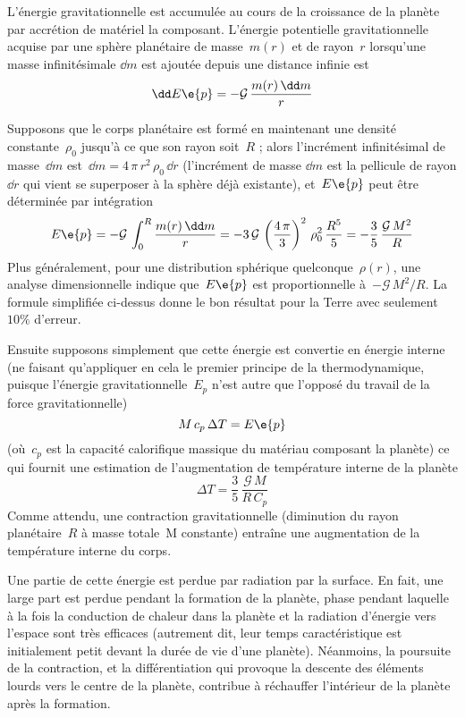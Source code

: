\sk
L'énergie gravitationnelle est accumulée au cours de la croissance de la planète
par accrétion de matériel la composant.
L'énergie potentielle gravitationnelle acquise par une sphère planétaire
de masse~$m(r)$ et de rayon~$r$ lorsqu'une masse infinitésimale $\dd m$
est ajoutée depuis une distance infinie est
\[ \dd E\e{p} = - \mathcal{G} \, \frac{m(r) \, \dd m}{r}  \]

\sk
Supposons que le corps planétaire est formé en maintenant une densité constante~$\rho_0$
jusqu'à ce que son rayon soit~$R$ ; alors l'incrément infinitésimal de masse~$\dd m$
est~$\dd m = 4 \, \pi \, r^2 \, \rho_0 \, \dd r$ 
(l'incrément de masse $\dd m$ est la pellicule de rayon $\dd r$ 
qui vient se superposer à la sphère déjà existante), 
et~$E\e{p}$ peut être déterminée par intégration
\[ E\e{p} = - \mathcal{G} \, \int_{0}^{R} \frac{m(r) \, \dd m}{r}  
= - 3 \, \mathcal{G} \, \left( \frac{4\,\pi}{3} \right)^2 \, \rho_0^2 \, \frac{R^5}{5}
= - \frac{3}{5} \, \frac{\mathcal{G}\,M^2}{R} \] 
\noindent Plus généralement, pour une distribution sphérique quelconque~$\rho(r)$,
une analyse dimensionnelle indique que~$E\e{p}$ est proportionnelle à~$-\mathcal{G}\,M^2/R$.
La formule simplifiée ci-dessus donne le bon résultat pour la Terre avec seulement~$10\%$ d'erreur.


\sk
Ensuite supposons simplement que cette énergie est convertie en énergie interne
(ne faisant qu'appliquer en cela le premier principe de la thermodynamique, puisque
l'énergie gravitationnelle~$E_p$ n'est autre que l'opposé du travail de la force gravitationnelle)
\[ M \, c_p \, \Delta T = E\e{p} \]
\noindent (où~$c_p$ est la capacité calorifique massique du matériau composant la planète)
ce qui fournit une estimation de l'augmentation de température interne de la planète
\[ \Delta T = \frac{3}{5} \, \frac{\mathcal{G}\,M}{R\,C_p} \]
\noindent Comme attendu, une contraction gravitationnelle 
(diminution du rayon planétaire~$R$ à masse totale~M constante)
entraîne une augmentation de la température interne du corps.

\sk
Une partie de cette énergie est perdue par radiation par la surface.
En fait, une large part est perdue pendant la formation de la planète,
phase pendant laquelle à la fois 
la conduction de chaleur dans la planète
et la radiation d'énergie vers l'espace
sont très efficaces (autrement dit, leur temps caractéristique
est initialement petit devant la durée de vie d'une planète).
Néanmoins, la poursuite de la contraction,
et la différentiation qui provoque la descente
des éléments lourds vers le centre de la planète,
contribue à réchauffer l'intérieur de la planète
après la formation.

